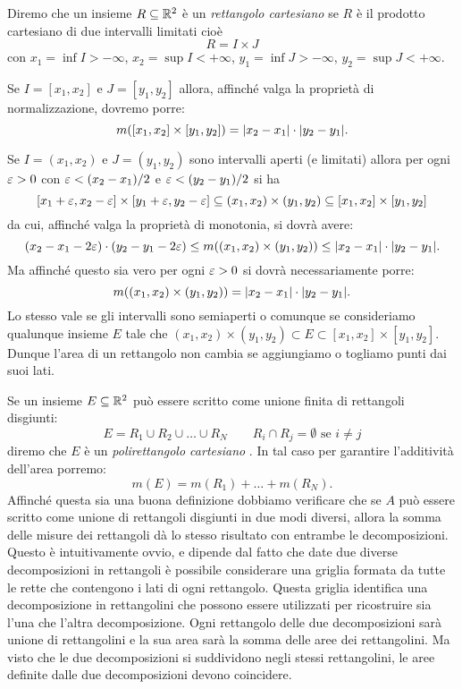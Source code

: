 Diremo che un insieme $R\subseteq {\mathbb R}^2$ è un
\emph{rettangolo cartesiano}%
%
se $R$ è il prodotto cartesiano di due intervalli limitati
cioè
\[
  R = I\times J
\]
con $x_1=\inf I>-\infty$,
$x_2=\sup I<+\infty$,
$y_1=\inf J > -\infty$,
$y_2=\sup J < +\infty$.

Se $I=[x_1,x_2]$ e $J=[y_1,y_2]$ allora,
affinché valga la proprietà di normalizzazione,
dovremo porre:
\[
  m([x_1,x_2]\times[y_1,y_2]) = {\left|x_2-x_1\right|}\cdot{\left|y_2-y_1\right|}.
\]

Se $I=(x_1,x_2)$ e $J=(y_1,y_2)$ sono intervalli aperti (e limitati) allora
per ogni $\varepsilon>0$ con $\varepsilon<(x_2-x_1)/2$ e $\varepsilon<(y_2-y_1)/2$ si ha
\[
  [x_1+\varepsilon,x_2-\varepsilon] \times [y_1+\varepsilon,y_2-\varepsilon]
  \subseteq (x_1,x_2)\times (y_1,y_2)
  \subseteq [x_1,x_2]\times [y_1,y_2]
\]
da cui, affinché valga la proprietà di monotonia, si dovrà avere:
\[
  (x_2-x_1-2\varepsilon)\cdot (y_2-y_1-2\varepsilon) \le m((x_1,x_2)\times(y_1,y_2)) \le {\left|x_2-x_1\right|}\cdot {\left|y_2-y_1\right|}.
\]
Ma affinché questo sia vero per ogni $\varepsilon>0$ si dovrà necessariamente
porre:
\[
  m((x_1,x_2)\times(y_1,y_2)) = {\left|x_2-x_1\right|}\cdot{\left|y_2-y_1\right|}.
\]
Lo stesso vale se gli intervalli sono semiaperti o comunque
se consideriamo qualunque insieme $E$ tale che $(x_1,x_2)\times (y_1,y_2) \subset E \subset [x_1,x_2]\times[y_1,y_2]$.
Dunque l'area di un rettangolo non cambia se aggiungiamo o togliamo punti
dai suoi lati.

Se un insieme $E\subseteq {\mathbb R}^2$ può essere scritto come unione finita
di rettangoli disgiunti:
\[
  E = R_1 \cup R_2 \cup \dots \cup R_N
  \qquad
  R_i \cap R_j=\emptyset\text{ se } i\neq j
\]
diremo che $E$ è un \emph{polirettangolo cartesiano}%
%
.
In tal caso per garantire l'additività dell'area
porremo:
\[
  m(E) = m(R_1) + \dots + m(R_N).
\]
Affinché questa sia una buona definizione dobbiamo verificare che
se $A$ può essere scritto come unione di rettangoli disgiunti in due modi
diversi, allora la somma delle misure dei rettangoli dà lo stesso
risultato con entrambe le decomposizioni.
Questo è intuitivamente ovvio, e dipende dal fatto che date due
diverse decomposizioni in rettangoli è possibile considerare
una griglia formata da tutte le rette che contengono i lati di ogni rettangolo.
Questa griglia identifica una decomposizione in rettangolini che possono essere
utilizzati per ricostruire sia l'una che l'altra decomposizione.
Ogni rettangolo delle due decomposizioni sarà unione di rettangolini e la sua
area sarà la somma delle aree dei rettangolini. Ma visto che le due
decomposizioni si suddividono negli stessi rettangolini, le aree definite
dalle due decomposizioni devono coincidere.

